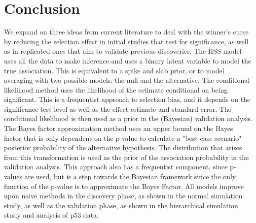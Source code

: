 \documentclass[AMA,STIX1COL]{WileyNJD-v2}\usepackage[]{graphicx}\usepackage[]{color}
\begin{document}
\begin{table}

\caption{\label{tab:unnamed-chunk-32}rs8073498n}
\centering
{}
\end{table}



\section{Conclusion}\label{sec:conclusion}


We expand on three ideas from current literature to deal with the winner's curse by reducing the selection effect in initial studies that test for significance, as well as in replicated ones that aim to validate previous discoveries. The HSS model uses all the data to make inference and uses a binary latent variable to model the true association. This is equivalent to a spike and slab prior, or to model averaging with two possible models: the null and the alternative.  The conditional likelihood method uses the likelihood of the estimate conditional on being significant. This is a frequentist approach to selection bias, and it depends on the significance test level as well as the effect estimate and standard error. The conditional likelihood is then used as a prior in the (Bayesian) validation analysis. The Bayes factor approximation method uses an upper bound on the Bayes factor that is only dependent on the p-value to calculate a "best-case scenario" posterior probability of the alternative hypothesis. The distribution that arises from this transformation is used as the prior of the association probability in the validation analysis. This approach also has a frequentist component, since p-values are used, but is a step towards the Bayesian framework since the only function of the p-value is to approximate the Bayes Factor. All models improve upon naive methods in the discovery phase, as shown in the normal simulation study, as well as the validation phase, as shown in the hierarchical simulation study and analysis of p53 data.
\end{document}
